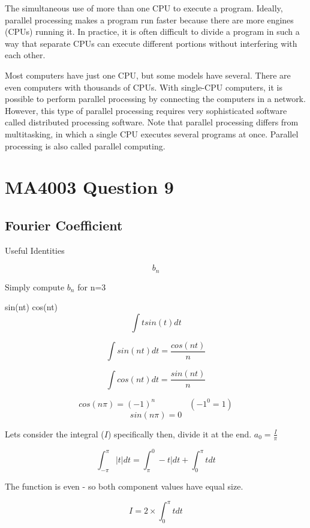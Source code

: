 \documentclass[12pt]{article} %
\begin{document}
The simultaneous use of more than one CPU to execute a program. Ideally, parallel processing makes a program run faster because there are more engines (CPUs) running it. In practice, it is often difficult to divide a program in such a way that separate CPUs can execute different portions without interfering with each other. 

Most computers have just one CPU, but some models have several. There are even computers with thousands of CPUs. With single-CPU computers, it is possible to perform parallel processing by connecting the computers in a network. However, this type of parallel processing requires very sophisticated software called distributed processing software. 
Note that parallel processing differs from multitasking, in which a single CPU executes several programs at once. 
Parallel processing is also called parallel computing.
 
\section{MA4003 Question 9}

\subsection{Fourier Coefficient}

Useful Identities

\[ b_n \]

Simply compute $b_n$ for n=3


sin(nt)
cos(nt)
\[ \int t sin(t) dt \]


\[\int sin(nt) dt = \frac{cos(nt)}{n}\]

\[\int cos(nt) dt = \frac{sin(nt)}{n}\]

\[cos(n\pi) = (-1)^n  \qquad \qquad (-1^0 = 1)\]
\[sin(n\pi) = 0\]




Lets consider the integral ($I$) specifically then, divide it at the end.
$a_0 = \frac{I}{\pi}$

\[ \int^{\pi}_{-\pi} |t| dt =  \int^{0}_{\pi} -t| dt + \int^{\pi}_{0} t dt \]

The function is even - so both component values have equal size.

\[ I = 2 \times \int^{\pi}_{0} t dt \]
\end{document}
